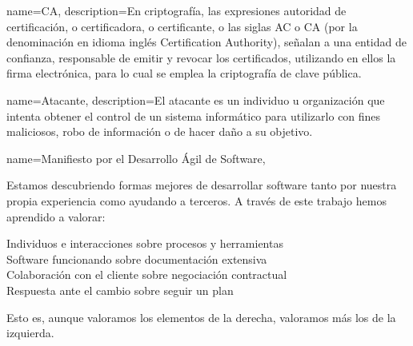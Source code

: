 {
    name=CA,
    description={En criptografía, las expresiones autoridad de certificación, o certificadora, o certificante, o las siglas AC o CA (por la
    denominación en idioma inglés Certification Authority), señalan a una entidad de confianza, responsable de emitir y revocar los certificados,
    utilizando en ellos la firma electrónica, para lo cual se emplea la criptografía de clave pública.~\cite[Wikipedia]{wiki:ca}}
}

{
    name=Atacante,
    description={El atacante es un individuo u organización que intenta obtener el control de un sistema informático para utilizarlo con fines
    maliciosos, robo de información o de hacer daño a su objetivo.~\cite[Wikipedia]{wiki:atacante}}
}

{
    name={Manifiesto por el Desarrollo Ágil de Software},
  }
{
    \par Estamos descubriendo formas mejores de desarrollar software tanto por nuestra propia experiencia como ayudando a terceros. A través de este trabajo hemos aprendido a valorar:
    \par {\Large Individuos e interacciones} sobre procesos y herramientas\\
    {\Large Software funcionando} sobre documentación extensiva\\
    {\Large Colaboración con el cliente} sobre negociación contractual\\
    {\Large Respuesta ante el cambio} sobre seguir un plan
    \par Esto es, aunque valoramos los elementos de la derecha, valoramos más los de la izquierda.~\cite{ManifiestoAgil}
}


